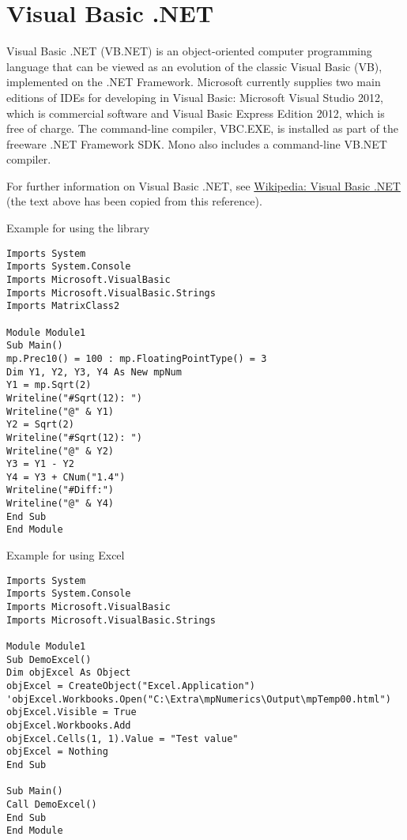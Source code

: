 \section{Visual Basic .NET}

Visual Basic .NET (VB.NET) is an object-oriented computer programming language that can be viewed as an evolution of the classic Visual Basic (VB), implemented on the .NET Framework. Microsoft currently supplies two main editions of IDEs for developing in Visual Basic: Microsoft Visual Studio 2012, which is commercial software and Visual Basic Express Edition 2012, which is free of charge. The command-line compiler, VBC.EXE, is installed as part of the freeware .NET Framework SDK. Mono also includes a command-line VB.NET compiler. 

\vpara
For further information on Visual Basic .NET, see \href{http://en.wikipedia.org/wiki/Visual_Basic_.NET}{Wikipedia: Visual Basic .NET} (the text above has been copied from this reference).


\vpara
Example for using the library


\begin{lstlisting}
Imports System
Imports System.Console
Imports Microsoft.VisualBasic
Imports Microsoft.VisualBasic.Strings
Imports MatrixClass2

Module Module1
Sub Main()
mp.Prec10() = 100 : mp.FloatingPointType() = 3
Dim Y1, Y2, Y3, Y4 As New mpNum
Y1 = mp.Sqrt(2)
Writeline("#Sqrt(12): ")
Writeline("@" & Y1)
Y2 = Sqrt(2)
Writeline("#Sqrt(12): ")
Writeline("@" & Y2)
Y3 = Y1 - Y2
Y4 = Y3 + CNum("1.4")
Writeline("#Diff:")
Writeline("@" & Y4)
End Sub
End Module
\end{lstlisting}


\vpara
Example for using Excel

\begin{lstlisting}
Imports System
Imports System.Console
Imports Microsoft.VisualBasic
Imports Microsoft.VisualBasic.Strings

Module Module1
Sub DemoExcel()
Dim objExcel As Object
objExcel = CreateObject("Excel.Application")
'objExcel.Workbooks.Open("C:\Extra\mpNumerics\Output\mpTemp00.html")
objExcel.Visible = True
objExcel.Workbooks.Add
objExcel.Cells(1, 1).Value = "Test value"
objExcel = Nothing
End Sub

Sub Main()
Call DemoExcel()
End Sub
End Module
\end{lstlisting}



